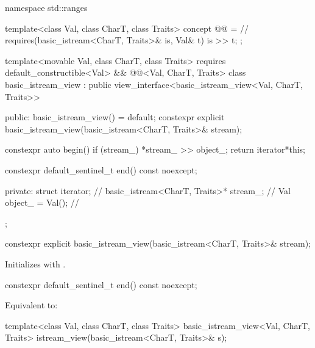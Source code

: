 %
\begin{codeblock}
namespace std::ranges {
  template<class Val, class CharT, class Traits>
    concept @@ =                // \expos
      requires(basic_istream<CharT, Traits>& is, Val& t) {
         is >> t;
      };

  template<movable Val, class CharT, class Traits>
    requires default_constructible<Val> &&
      @@<Val, CharT, Traits>
  class basic_istream_view : public view_interface<basic_istream_view<Val, CharT, Traits>> {
  public:
    basic_istream_view() = default;
    constexpr explicit basic_istream_view(basic_istream<CharT, Traits>& stream);

    constexpr auto begin()
    {
      if (stream_) {
        *stream_ >> object_;
      }
      return iterator{*this};
    }

    constexpr default_sentinel_t end() const noexcept;

  private:
    struct iterator;                                    // \expos
    basic_istream<CharT, Traits>* stream_{};            // \expos
    Val object_ = Val();                                // \expos
  };
}
\end{codeblock}

%
\begin{itemdecl}
constexpr explicit basic_istream_view(basic_istream<CharT, Traits>& stream);
\end{itemdecl}

\begin{itemdescr}
\pnum
\effects
Initializes  with .
\end{itemdescr}

%
\begin{itemdecl}
constexpr default_sentinel_t end() const noexcept;
\end{itemdecl}

\begin{itemdescr}
\pnum
\effects
Equivalent to: 
\end{itemdescr}

%
\begin{itemdecl}
template<class Val, class CharT, class Traits>
basic_istream_view<Val, CharT, Traits> istream_view(basic_istream<CharT, Traits>& s);
\end{itemdecl}

